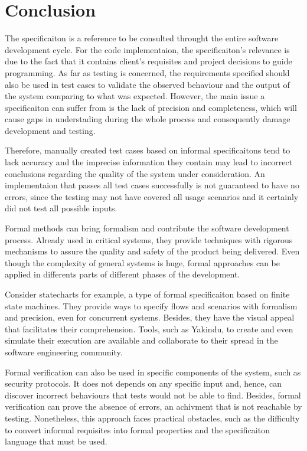 \chapter{Conclusion}
\label{cap:conclusoes}

The specificaiton is a reference to be consulted throught the entire software development cycle. For the code implementaion, the specificaiton's relevance is due to the fact that it contains client's requisites and project decisions to guide programming. As far as testing is concerned, the requirements specified should also be used in test cases to validate the observed behaviour and the output of the system comparing to what was expected. However, the main issue a specificaiton can suffer from is the lack of precision and completeness, which will cause gaps in understading during the whole process and consequently damage development and testing.

Therefore, manually created test cases based on informal specificaitons tend to lack accuracy and the imprecise information they contain may lead to incorrect conclusions regarding the quality of the system under consideration. An implementaion that passes all test cases successfully is not guaranteed to have no errors, since the testing may not have covered all usage scenarios and it certainly did not test all possible inputs.

Formal methods can bring formalism and contribute the software development process. Already used in critical systems, they provide techniques with rigorous mechanisms to assure the quality and safety of the product being delivered. Even though the complexity of general systems is huge, formal approaches can be applied in differents parts of different phases of the development.

Consider statecharts for example, a type of formal specificaiton based on finite state machines. They provide ways to specify flows and scenarios with formalism and precision, even for concurrent systems. Besides, they have the visual appeal that facilitates their comprehension. Tools, such as Yakindu, to create and even simulate their execution are available and collaborate to their spread in the software engineering community.

Formal verification can also be used in specific components of the system, such as security protocols. It does not depends on any specific input and, hence, can discover incorrect behaviours that tests would not be able to find. Besides, formal verification can prove the absence of errors, an achivment that is not reachable by testing. Nonetheless, this approach faces practical obstacles, such as the difficulty to convert informal requisites into formal properties and the specificaiton language that must be used.

